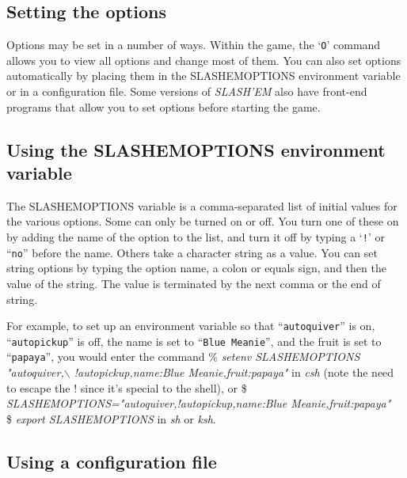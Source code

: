 \subsection*{Setting the options}


Options may be set in a number of ways.  Within the game, the `{\tt O}'
command allows you to view all options and change most of them.
You can also set options automatically by placing them in the
SLASHEMOPTIONS environment variable or in a configuration file.
Some versions of {\it SLASH'EM\/} also have front-end programs that allow
you to set options before starting the game.
\subsection*{Using the SLASHEMOPTIONS environment variable}


The SLASHEMOPTIONS variable is a comma-separated list of initial
values for the various options.  Some can only be turned on or off.
You turn one of these on by adding the name of the option to the list,
and turn it off by typing a `{\tt !}' or ``{\tt no}'' before the name.  Others take a 
character string as a value.  You can set string options by typing
the option name, a colon or equals sign, and then the value of the string.
The value is terminated by the next comma or the end of string.

For example, to set up an environment variable so that ``{\tt autoquiver}'' is on,
``{\tt autopickup}'' is off, the name is set to ``{\tt Blue Meanie}'', and the fruit
is set to ``{\tt papaya}'', you would enter the command
\% {\it setenv SLASHEMOPTIONS "autoquiver,$\backslash$ !autopickup,name:Blue Meanie,fruit:papaya"\/}
in {\it csh\/} (note the need to escape the ! since it's special to the shell), or
\$ {\it SLASHEMOPTIONS="autoquiver,!autopickup,name:Blue Meanie,fruit:papaya"\/}\\
\$ {\it export SLASHEMOPTIONS\/}
in {\it sh\/} or {\it ksh}.
\subsection*{Using a configuration file}



